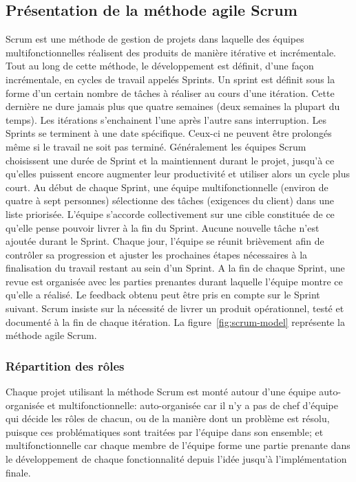 \subsection{Présentation de la méthode agile Scrum}

Scrum est une méthode de gestion de projets dans laquelle des équipes
multifonctionnelles réalisent des produits de manière itérative et
incrémentale. Tout au long de cette méthode, le développement est définit,
d'une façon incrémentale, en cycles de travail appelés Sprints. Un sprint est
définit sous la forme d'un certain nombre de tâches à réaliser au cours d'une
itération. Cette dernière ne dure jamais plus que quatre semaines (deux
semaines la plupart du temps). Les itérations s'enchainent l'une après l'autre
sans interruption. Les Sprints se terminent à une date spécifique. Ceux-ci ne
peuvent être prolongés même si le travail ne soit pas terminé. Généralement les
équipes Scrum choisissent une durée de Sprint et la maintiennent durant le
projet, jusqu'à ce qu'elles puissent encore augmenter leur productivité et
utiliser alors un cycle plus court. Au début de chaque Sprint, une équipe
multifonctionnelle (environ de quatre à sept personnes) sélectionne des tâches
(exigences du client) dans une liste priorisée. L'équipe s'accorde
collectivement sur une cible constituée de ce qu'elle pense pouvoir livrer à la
fin du Sprint. Aucune nouvelle tâche n'est ajoutée durant le Sprint. Chaque
jour, l'équipe se réunit brièvement afin de contrôler sa progression et ajuster
les prochaines étapes nécessaires à la finalisation du travail restant au sein
d'un Sprint. A la fin de chaque Sprint, une revue est organisée avec les
parties prenantes durant laquelle l'équipe montre ce qu'elle a réalisé. Le
feedback obtenu peut être pris en compte sur le Sprint suivant. Scrum insiste
sur la nécessité de livrer un produit opérationnel, testé et documenté à la fin
de chaque itération. La figure~\ref{fig:scrum-model} représente la méthode
agile Scrum.



\subsubsection{Répartition des rôles}

Chaque projet utilisant la méthode Scrum est monté autour d'une équipe
auto-organisée et multifonctionnelle: auto-organisée car il n'y a pas de chef
d'équipe qui décide les rôles de chacun, ou de la manière dont un problème est
résolu, puisque ces problématiques sont traitées par l'équipe dans son
ensemble; et multifonctionnelle car chaque membre de l'équipe forme une partie
prenante dans le développement de chaque fonctionnalité depuis l'idée jusqu'à
l'implémentation finale.

